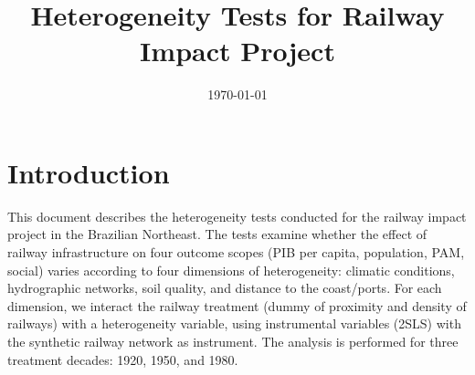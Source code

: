 \documentclass{article}
\title{Heterogeneity Tests for Railway Impact Project}
\author{}
\date{\today}
\begin{document}
\maketitle
\section{Introduction}
This document describes the heterogeneity tests conducted for the railway impact project in the Brazilian Northeast. The tests examine whether the effect of railway infrastructure on four outcome scopes (PIB per capita, population, PAM, social) varies according to four dimensions of heterogeneity: climatic conditions, hydrographic networks, soil quality, and distance to the coast/ports. For each dimension, we interact the railway treatment (dummy of proximity and density of railways) with a heterogeneity variable, using instrumental variables (2SLS) with the synthetic railway network as instrument. The analysis is performed for three treatment decades: 1920, 1950, and 1980.
\end{document}
